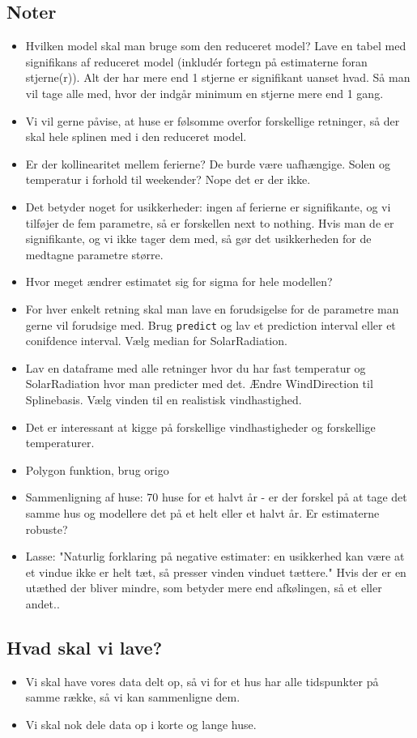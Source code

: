 \subsection{Noter}
\begin{itemize}
        \item Hvilken model skal man bruge som den reduceret model? Lave en tabel med signifikans af reduceret model (inkludér fortegn på estimaterne foran stjerne(r)). Alt der har mere end 1 stjerne er signifikant uanset hvad. Så man vil tage alle med, hvor der indgår minimum en stjerne mere end 1 gang. 
        \item Vi vil gerne påvise, at huse er følsomme overfor forskellige retninger, så der skal hele splinen med i den reduceret model. 
        \item Er der kollinearitet mellem ferierne? De burde være uafhængige. Solen og temperatur i forhold til weekender? Nope det er der ikke. 
        \item Det betyder noget for usikkerheder: ingen af ferierne er signifikante, og vi tilføjer de fem parametre, så er forskellen next to nothing. Hvis man de er signifikante, og vi ikke tager dem med, så gør det usikkerheden for de medtagne parametre større. 
        \item Hvor meget ændrer estimatet sig for sigma for hele modellen? 
        \item For hver enkelt retning skal man lave en forudsigelse for de parametre man gerne vil forudsige med. Brug \texttt{predict} og lav et prediction interval eller et conifdence interval. Vælg median for SolarRadiation. 
        \item Lav en dataframe med alle retninger hvor du har fast temperatur og SolarRadiation hvor man predicter med det. Ændre WindDirection til Splinebasis. Vælg vinden til en realistisk vindhastighed. 
        \item Det er interessant at kigge på forskellige vindhastigheder og forskellige temperaturer. 
        \item Polygon funktion, brug origo 
        \item Sammenligning af huse: 70 huse for et halvt år - er der forskel på at tage det samme hus og modellere det på et helt eller et halvt år. Er estimaterne robuste?
        \item Lasse: "Naturlig forklaring på negative estimater: en usikkerhed kan være at et vindue ikke er helt tæt, så presser vinden vinduet tættere." Hvis der er en utæthed der bliver mindre, som betyder mere end afkølingen, så et eller andet.. 
\end{itemize}

\subsection{Hvad skal vi lave?}
\begin{itemize}
    \item Vi skal have vores data delt op, så vi for et hus har alle tidspunkter på samme række, så vi kan sammenligne dem.
    \item Vi skal nok dele data op i korte og lange huse.  
\end{itemize}